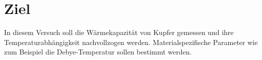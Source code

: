 \section{Ziel}
\label{sec:Ziel}
In diesem Versuch soll die Wärmekapazität von Kupfer gemessen und ihre Temperaturabhängigkeit nachvollzogen werden. Materialspezifische Parameter wie zum Beispiel die Debye-Temperatur sollen bestimmt werden.
